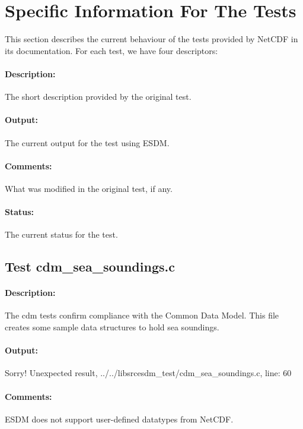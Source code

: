 \section{Specific Information For The Tests}
\label{sec:nctests}

This section describes the current behaviour of the tests provided by NetCDF in its documentation. For each test, we have four descriptors:

\paragraph{Description:} The short description provided by the original test.

\paragraph{Output:} The current output for the test using ESDM.

\paragraph{Comments:} What was modified in the original test, if any.

\paragraph{Status:} The current status for the test.

\subsection{Test cdm\_sea\_soundings.c}

\paragraph{Description:} The cdm tests confirm compliance with the Common Data Model. This file creates some sample data structures to hold sea soundings.

\paragraph{Output:} Sorry! Unexpected result, ../../libsrcesdm\_test/cdm\_sea\_soundings.c, line: 60

\paragraph{Comments:} ESDM does not support user-defined datatypes from NetCDF.


